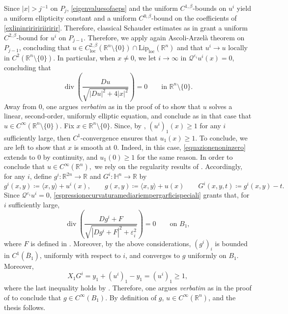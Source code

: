 \documentclass[11pt]{amsart}
\renewcommand{\geq}{\geqslant}
\renewcommand{\ge}{>}
\newcommand{\rr}{{\mathbb{R}}}
\newcommand{\hh}{{\mathbb{H}}}
\newcommand{\eps}{\varepsilon}
\newcommand{\Qei}{\mathcal Q^{\eps_i}}
\DeclareMathOperator{\divv}{div}
\theoremstyle{definition}
\theoremstyle{remark}
\numberwithin{equation}{section}
\begin{document}
Since $|x|\ge j^{-1}$ on $P_j$, \eqref{eigenvaluesofaeps} and the uniform $C^{1,\beta}$-bounds on $u^i$ yield a uniform ellipticity constant and a uniform $C^{0,\beta}$-bound on the coefficients of \eqref{exlininririririiririr}. Therefore, classical Schauder estimates as in \cite[Theorem 6.2]{MR1814364} grant a uniform $C^{2,\beta}$-bound for $u^i$ on $P_{j-1}$. Therefore, we apply again Ascoli-Arzelà theorem on $P_{j-1}$, concluding that $u\in C^{2,\beta}_{\mathrm{loc}}(\rr^n\setminus\{0\})\cap \mathrm{Lip}_\mathrm{loc}(\rr^n)$ and that $u^i\to u$ locally in $C^2(\rr^n\setminus\{0\})$. In particular, when $x\neq 0$, we let $i\to\infty$ in $\Qei u^i(x)=0$, concluding that 
\begin{equation}\label{equazionenoninzero}
    \divv\left(\frac{Du}{\sqrt{|Du|^2+4|x|^2}}\right)=0\qquad\text{in }\rr^n\setminus\{0\}.
\end{equation}
Away from $0$, one argues \emph{verbatim} as in the proof of  to show that $u$ solves a linear, second-order, uniformly elliptic equation, and conclude as in that case that $u\in C^\infty(\rr^n\setminus\{0\})$. Fix $x\in\rr^n\setminus\{0\}$. Since, by , $(u^i)_1(x)\geq 1$ for any $i$ sufficiently large, then $C^1$-convergence ensures that $u_1(x)\geq 1$. To conclude, we are left to show that $x$ is smooth at $0$. Indeed, in this case,  \eqref{equazionenoninzero} extends to $0$ by continuity, and $u_1(0)\geq 1$ for the same reason. In order to conclude that $u\in C^\infty(\rr^n),$ we rely on the regularity results of \cite{MR2774306}. Accordingly, for any $i$, define $g^i:\rr^{2n}\to\rr$ and $G^i:\hh^n\to\rr$ by 
\begin{equation*}
    g^i(x,y)\coloneqq\langle x,y\rangle+u^i(x),\qquad  g(x,y)\coloneqq\langle x,y\rangle+u(x)\qquad G^i(x,y,t)\coloneqq g^i(x,y)-t.
\end{equation*}
Since $\Qei u^i=0$,  \eqref{espressionecurvaturamediariempergarficispeciali} grants that, for $i$ sufficiently large,
\begin{equation*}
    \divv\left(\frac{Dg^i+F}{\sqrt{|Dg^i+F|^2+\eps_i^2}}\right)=0\qquad\text{on }B_1,
\end{equation*}
where $F$ is defined in . Moreover, by the above considerations, $(g^i)_i$ is bounded in $C^1(\overline B_1)$, uniformly with respect to $i$, and converges to $g$ uniformly on $B_1$. Moreover,
\begin{equation*}
    X_1 G^i=y_1+(u^i)_1-y_1=(u^i)_1\geq 1,
\end{equation*}
where the last inequality holds by . Therefore, one argues \emph{verbatim} as in the proof of \cite[Corollary 1.3]{MR2774306} to conclude that $g\in C^\infty(B_1)$. By definition of $g$, $u\in C^\infty(\rr^n)$, and the thesis follows.
\end{document}
